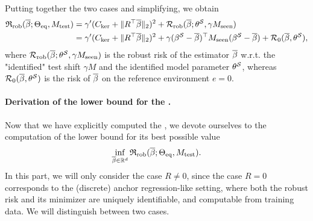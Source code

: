 Putting together the two cases and simplifying, we obtain
\begin{align}\label{eqn:detailed-id-robust-risk}
\begin{split}
    \mathfrak{R}_{\mathrm{rob}}(\overline{\beta}; \Theta_{\mathrm{eq}}, M_{\mathrm{test}}) &= \gamma'(C_{\mathrm{ker}} + \| R^\top \overline{\beta} \|_2)^2 + \mathcal{R}_{\mathrm{rob}}(\overline{\beta}; \theta^{\mathcal{S}}, \gamma M_{\mathrm{seen}}) \\  &= \gamma'  (C_{\mathrm{ker}} + \| R^\top \overline{\beta} \|_2)^2 + \gamma (\beta^{\mathcal{S}} - \overline{\beta})^\top M_{\mathrm{seen}} (\beta^{\mathcal{S}}-\overline{\beta}) + \mathcal{R}_0 (\overline{\beta},\theta^{\mathcal{S}}), 
\end{split}
\end{align}
where $\mathcal{R}_{\mathrm{rob}}(\overline{\beta}; \theta^{\mathcal{S}}, \gamma M_{\mathrm{seen}})$ is the robust risk of the estimator $\overline{\beta}$ w.r.t. the "identified" test shift $\gamma M$ and the identified model parameter $\theta^{\mathcal{S}}$, whereas $\mathcal{R}_0 (\overline{\beta},\theta^{\mathcal{S}})$ is the risk of $\overline{\beta}$ on the reference environment $e = 0$. 
\paragraph{Derivation of the lower bound for the \idRR.} Now that we have explicitly computed the \idRR, we devote ourselves to the computation of the lower bound for its best possible value
\begin{align*}
    \inf_{\overline{\beta} \in \mathbb{R}^d} \mathfrak{R}_{\mathrm{rob}}(\overline{\beta}; \Theta_{\mathrm{eq}}, M_{\mathrm{test}}). 
\end{align*}
In this part, we will only consider the case $R \neq 0$, since the case $R = 0$ corresponds to the (discrete) anchor regression-like setting, where both the robust risk and its minimizer are uniquely identifiable, and computable from training data. We will distinguish between two cases.
